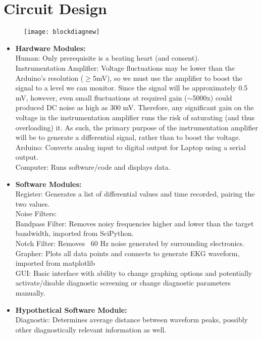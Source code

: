 \documentclass[11pt, oneside]{article}   	%
\begin{document}
\section{Circuit Design}
\begin{figure}[htb!]
\centering
\texttt{[image: blockdiagnew]}
\end{figure}
\begin{itemize}[leftmargin=*]

\item[] \textbf{Hardware Modules:}\\
	Human: Only prerequisite is a beating heart (and consent).\\
	Instrumentation Amplifier: Voltage fluctuations may be lower than the Arduino's resolution ($\geq$5mV), so we must use the amplifier to boost the signal to a level we can monitor. Since the signal will be approximately 0.5 mV, however, even small fluctuations at required gain ($\sim$5000x) could produced DC noise as high as 300 mV. \cite{karptalk} Therefore, any significant gain on the voltage in the instrumentation amplifier runs the risk of saturating (and thus overloading) it. As such, the primary purpose of the instrumentation amplifier will be to generate a differential signal, rather than to boost the voltage.\\
	Arduino: Converts analog input to digital output for Laptop using a serial output.\\
	Computer: Runs software/code and displays data. 
	
\item[] \textbf{Software Modules:}\\
	Register: Generates a list of differential values and time recorded, pairing the two values.\\
	Noise Filters:\\
		Bandpass Filter: Removes noisy frequencies higher and lower than the target bandwidth, imported from SciPython. \cite{SciPython}\\
		Notch Filter: Removes ~60 Hz noise generated by surrounding electronics.  
	Grapher: Plots all data points and connects to generate EKG waveform, imported from matplotlib \cite{matplotlib}\\
	GUI: Basic interface with ability to change graphing options and potentially activate/disable diagnostic screening or change diagnostic parameters manually.\\
	
\item[] \textbf{Hypothetical Software Module:}\\
	Diagnostic: Determines average distance between waveform peaks, possibly other diagnostically relevant information as well.
\end{itemize}
\end{document}
